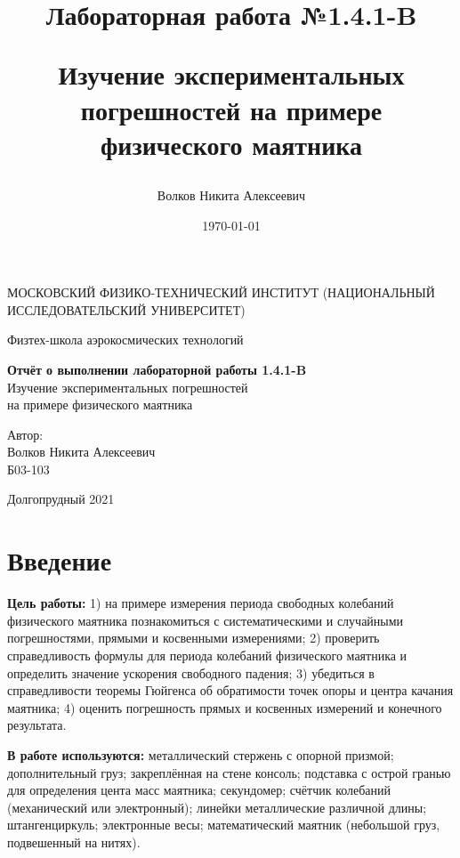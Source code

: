\documentclass[a4paper,12pt]{article}
\author{Волков Никита Алексеевич}
\title{Лабораторная работа №1.4.1-B

Изучение экспериментальных погрешностей на примере физического маятника
}
\date{\today}
\begin{document}
\begin{titlepage}
	\begin{center}
		{\large МОСКОВСКИЙ ФИЗИКО-ТЕХНИЧЕСКИЙ ИНСТИТУТ (НАЦИОНАЛЬНЫЙ ИССЛЕДОВАТЕЛЬСКИЙ УНИВЕРСИТЕТ)}
	\end{center}
	\begin{center}
		{\large Физтех-школа аэрокосмических технологий}
	\end{center}
	
	
	\vspace{4.5cm}
	{\huge
		\begin{center}
			{\bf Отчёт о выполнении лабораторной работы 1.4.1-B}\\
			Изучение экспериментальных погрешностей\\
			на примере физического маятника
		\end{center}
	}
	\vspace{2cm}
	\begin{flushright}
		{\LARGE Автор:\\ Волков Никита Алексеевич \\
			\vspace{0.2cm}
			Б03-103}
	\end{flushright}
	\vspace{8cm}
	\begin{center}
		Долгопрудный 2021
	\end{center}
\end{titlepage}

\tableofcontents

\newpage


\section{Введение}


\textbf{Цель работы:} 1) на примере измерения периода свободных колебаний физического маятника познакомиться с систематическими и случайными погрешностями, прямыми и косвенными измерениями; 2) проверить справедливость формулы для периода колебаний физического маятника и определить значение ускорения свободного падения; 3) убедиться в справедливости теоремы Гюйгенса об обратимости точек опоры и центра качания маятника; 4) оценить погрешность прямых и косвенных измерений и конечного результата.
\medskip

\textbf{В работе используются:} металлический стержень с опорной призмой; дополнительный груз; закреплённая на стене консоль; подставка с острой гранью для определения цента масс маятника; секундомер; счётчик колебаний (механический или
электронный); линейки металлические различной длины; штангенциркуль; электронные весы; математический маятник (небольшой груз, подвешенный на нитях).
\medskip
\end{document}
